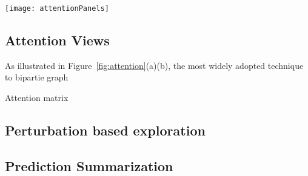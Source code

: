 \begin{figure*}[t]
\centering
\vspace{-2mm}
 \texttt{[image: attentionPanels]}
  \vspace{-6mm}
 \caption{
Attention visualization. In the graph attention view (a), a bipartite graph encoding is adopted, in which the edge thickness corresponds to the attention value. In the matrix attention view (b), the entries of $i^{th}$ row represent the probabilities of words in hypotheses align to the $i^{th}$ word in the premise.
The user can alter the attention values via the pop-up interface illustrated in (c).
We overlay the dependency tree ($a_1$) grammar structure to highlight important words and allow simplification of complex sentence based on the dependency tree.
%
For highly asymmetric attention relationship, we utilized a zoomable hierarchical visual representation (d).
}
\label{fig:attention}
\end{figure*}

\subsection{Attention Views}
As illustrated in Figure~\ref{fig:attention}(a)(b), the most widely adopted technique to bipartie graph

Attention matrix


\subsection{Perturbation based exploration}
\label{sec:perturb}

\subsection{Prediction Summarization}



